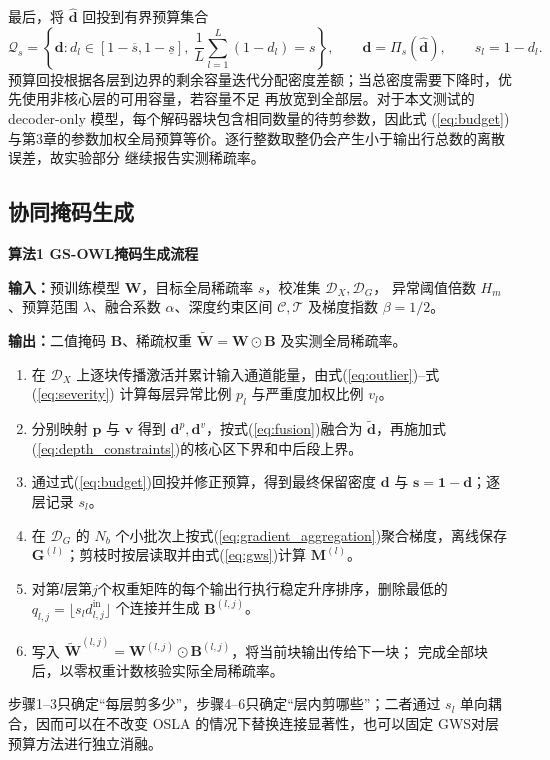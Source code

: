 \documentclass[UTF8,fontset=fandol]{ctexart}
\newcommand{\gws}{\textsc{GWS}}
\begin{document}
最后，将 $\widehat{\bm d}$ 回投到有界预算集合
\begin{equation}
\mathcal Q_s=
\left\{
\bm d:
d_l\in[1-\overline s,1-\underline s],\
\frac{1}{L}\sum_{l=1}^{L}(1-d_l)=s
\right\},
\qquad
\bm d=\Pi_s(\widehat{\bm d}),\qquad s_l=1-d_l.
\label{eq:budget}
\end{equation}
预算回投根据各层到边界的剩余容量迭代分配密度差额；当总密度需要下降时，优先使用非核心层的可用容量，若容量不足
再放宽到全部层。对于本文测试的 decoder-only 模型，每个解码器块包含相同数量的待剪参数，因此式
(\ref{eq:budget})与第3章的参数加权全局预算等价。逐行整数取整仍会产生小于输出行总数的离散误差，故实验部分
继续报告实测稀疏率。

\subsection{协同掩码生成}

\noindent\textbf{算法1 GS-OWL掩码生成流程}\par
\noindent\textbf{输入：}预训练模型 $\bm W$，目标全局稀疏率 $s$，校准集 $\mathcal D_X,\mathcal D_G$，
异常阈值倍数 $H_m$、预算范围 $\lambda$、融合系数 $\alpha$、深度约束区间 $\mathcal C,\mathcal T$
及梯度指数 $\beta=1/2$。\par
\noindent\textbf{输出：}二值掩码 $\bm B$、稀疏权重 $\widetilde{\bm W}=\bm W\odot\bm B$ 及实测全局稀疏率。\par
\begin{enumerate}[leftmargin=2.3em,itemsep=2pt,topsep=2pt]
  \item 在 $\mathcal D_X$ 上逐块传播激活并累计输入通道能量，由式(\ref{eq:outlier})--式(\ref{eq:severity})
  计算每层异常比例 $p_l$ 与严重度加权比例 $v_l$。
  \item 分别映射 $\bm p$ 与 $\bm v$ 得到 $\bm d^p,\bm d^v$，按式(\ref{eq:fusion})融合为
  $\widetilde{\bm d}$，再施加式(\ref{eq:depth_constraints})的核心区下界和中后段上界。
  \item 通过式(\ref{eq:budget})回投并修正预算，得到最终保留密度 $\bm d$ 与
  $\bm s=\bm 1-\bm d$；逐层记录 $s_l$。
  \item 在 $\mathcal D_G$ 的 $N_b$ 个小批次上按式(\ref{eq:gradient_aggregation})聚合梯度，离线保存
  $\bm G^{(l)}$；剪枝时按层读取并由式(\ref{eq:gws})计算 $\bm M^{(l)}$。
  \item 对第$l$层第$j$个权重矩阵的每个输出行执行稳定升序排序，删除最低的
  $q_{l,j}=\lfloor s_l d_{l,j}^{\mathrm{in}}\rfloor$ 个连接并生成 $\bm B^{(l,j)}$。
  \item 写入 $\widetilde{\bm W}^{(l,j)}=\bm W^{(l,j)}\odot\bm B^{(l,j)}$，将当前块输出传给下一块；
  完成全部块后，以零权重计数核验实际全局稀疏率。
\end{enumerate}
步骤1--3只确定“每层剪多少”，步骤4--6只确定“层内剪哪些”；二者通过 $s_l$ 单向耦合，因而可以在不改变
OSLA 的情况下替换连接显著性，也可以固定 \gws 对层预算方法进行独立消融。
\end{document}
